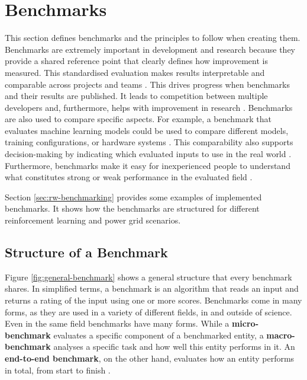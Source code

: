 \section{Benchmarks}\label{sec:benchmarks}
This section defines benchmarks and the principles to follow when creating them. 
Benchmarks are extremely important in development and research because they provide a shared reference point that clearly defines how improvement is measured. This standardised evaluation makes results interpretable and comparable across projects and teams \cite{mlperf_benchmark,ml_benchmarks}.
This drives progress when benchmarks and their results are published. It leads to competition between multiple developers and, furthermore, helps with improvement in research \cite{mlperf_benchmark, ml_benchmarks, building_benchmarks4models}.
Benchmarks are also used to compare specific aspects. For example, a benchmark that evaluates machine learning models could be used to compare different models, training configurations, or hardware systems \cite{ml_benchmark_design}.
This comparability also supports decision-making by indicating which evaluated inputs to use in the real world \cite{building_benchmarks4models}. 
Furthermore, benchmarks make it easy for inexperienced people to understand what constitutes strong or weak performance in the evaluated field \cite{building_benchmarks4models}. 

Section \ref{sec:rw-benchmarking} provides some examples of implemented benchmarks. It shows how the benchmarks are structured for different reinforcement learning and power grid scenarios.


\subsection{Structure of a Benchmark}\label{ssec:structure-benchmark}
Figure \ref{fig:general-benchmark} shows a general structure that every benchmark shares. In simplified terms, a benchmark is an algorithm that reads an input and returns a rating of the input using one or more scores. Benchmarks come in many forms, as they are used in a variety of different fields, in and outside of science. Even in the same field benchmarks have many forms. While a \textbf{micro-benchmark} evaluates a specific component of a benchmarked entity, a \textbf{macro-benchmark} analyses a specific task and how well this entity performs in it. An \textbf{end-to-end benchmark}, on the other hand, evaluates how an entity performs in total, from start to finish \cite{ml_benchmark_design}.


